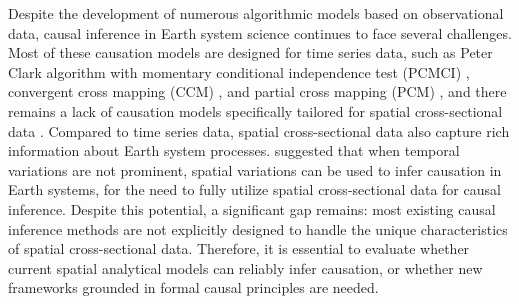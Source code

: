 \documentclass[authoryear,preprint,review,12pt]{elsarticle}
\begin{document}
Despite the development of numerous algorithmic models based on observational data, causal inference in Earth system science continues to face several challenges. Most of these causation models are designed for time series data, such as Peter Clark algorithm with momentary conditional independence test (PCMCI) \citep{runge2019pcmci}, convergent cross mapping (CCM) \citep{sugihara2012ccm}, and partial cross mapping (PCM) \citep{leng2020pcm}, and there remains a lack of causation models specifically tailored for spatial cross-sectional data \citep{gao2022ciss,gao2023gccm}. Compared to time series data, spatial cross-sectional data also capture rich information about Earth system processes. \cite{gao2022tscess} suggested that when temporal variations are not prominent, spatial variations can be used to infer causation in Earth systems, for the need to fully utilize spatial cross-sectional data for causal inference. Despite this potential, a significant gap remains: most existing causal inference methods are not explicitly designed to handle the unique characteristics of spatial cross-sectional data. Therefore, it is essential to evaluate whether current spatial analytical models can reliably infer causation, or whether new frameworks grounded in formal causal principles are needed.
\end{document}
